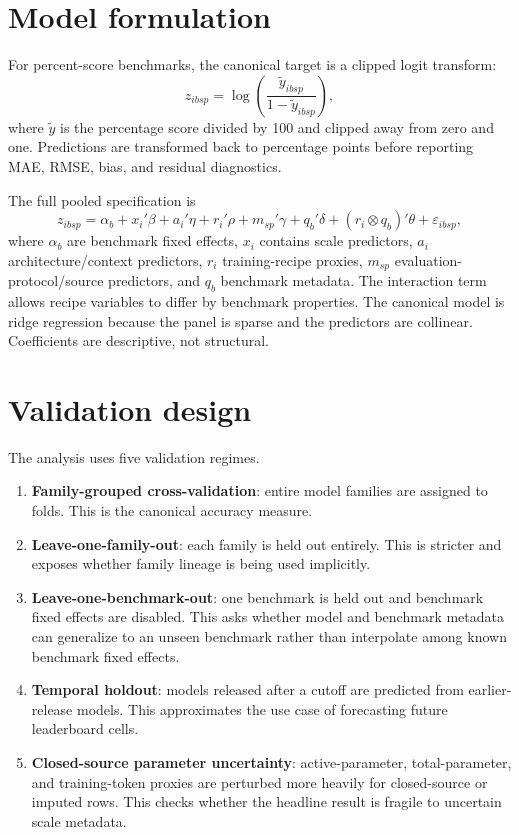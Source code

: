 \documentclass[11pt]{article}
\begin{document}
\section{Model formulation}
For percent-score benchmarks, the canonical target is a clipped logit transform:
\[
  z_{i b s p}=\log\left(\frac{\tilde y_{i b s p}}{1-\tilde y_{i b s p}}\right),
\]
where $\tilde y$ is the percentage score divided by 100 and clipped away from zero and one.  Predictions are transformed back to percentage points before reporting MAE, RMSE, bias, and residual diagnostics.

The full pooled specification is
\[
 z_{i b s p}=\alpha_b + x_i'\beta + a_i'\eta + r_i'\rho + m_{s p}'\gamma + q_b'\delta
 + (r_i \otimes q_b)'\theta + \varepsilon_{i b s p},
\]
where $\alpha_b$ are benchmark fixed effects, $x_i$ contains scale predictors, $a_i$ architecture/context predictors, $r_i$ training-recipe proxies, $m_{sp}$ evaluation-protocol/source predictors, and $q_b$ benchmark metadata.  The interaction term allows recipe variables to differ by benchmark properties.  The canonical model is ridge regression because the panel is sparse and the predictors are collinear.  Coefficients are descriptive, not structural.

\section{Validation design}
The analysis uses five validation regimes.
\begin{enumerate}[leftmargin=*]
\item \textbf{Family-grouped cross-validation}: entire model families are assigned to folds.  This is the canonical accuracy measure.
\item \textbf{Leave-one-family-out}: each family is held out entirely.  This is stricter and exposes whether family lineage is being used implicitly.
\item \textbf{Leave-one-benchmark-out}: one benchmark is held out and benchmark fixed effects are disabled.  This asks whether model and benchmark metadata can generalize to an unseen benchmark rather than interpolate among known benchmark fixed effects.
\item \textbf{Temporal holdout}: models released after a cutoff are predicted from earlier-release models.  This approximates the use case of forecasting future leaderboard cells.
\item \textbf{Closed-source parameter uncertainty}: active-parameter, total-parameter, and training-token proxies are perturbed more heavily for closed-source or imputed rows.  This checks whether the headline result is fragile to uncertain scale metadata.
\end{enumerate}
\end{document}
